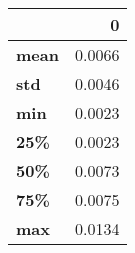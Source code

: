 \begin{tabular}{lr}
\toprule
{} &       0 \\
\midrule
\textbf{mean} &  0.0066 \\
\textbf{std } &  0.0046 \\
\textbf{min } &  0.0023 \\
\textbf{25\% } &  0.0023 \\
\textbf{50\% } &  0.0073 \\
\textbf{75\% } &  0.0075 \\
\textbf{max } &  0.0134 \\
\bottomrule
\end{tabular}
